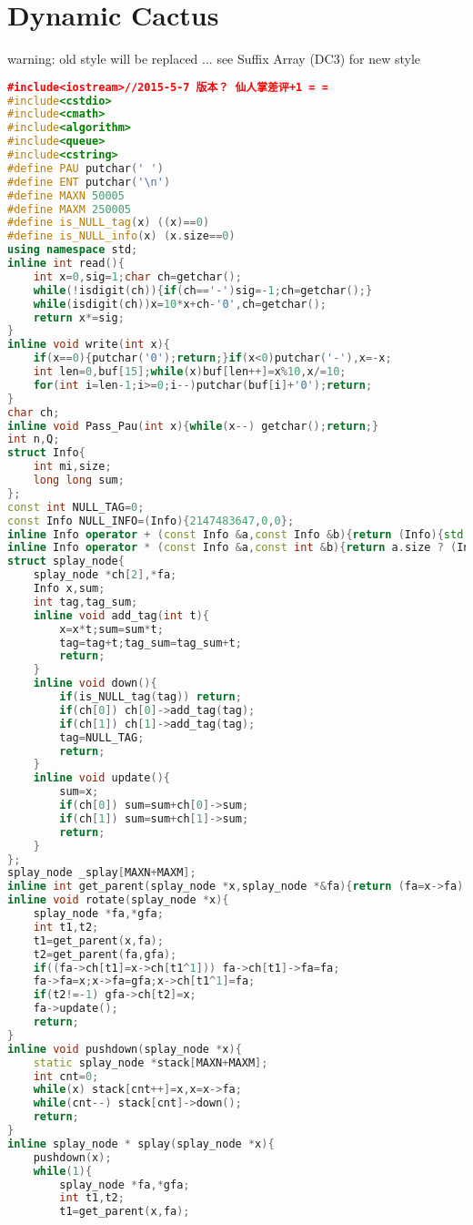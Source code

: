\documentclass{book}
\begin{document}
\section{Dynamic Cactus}
warning: old style will be replaced ... see Suffix Array (DC3) for new style\begin{lstlisting}[language=C++,title={Dynamic Cactus.hpp (14822 bytes, 608 lines)}]
﻿#include<iostream>//2015-5-7 版本？ 仙人掌差评+1 = =
#include<cstdio>
#include<cmath>
#include<algorithm>
#include<queue>
#include<cstring>
#define PAU putchar(' ')
#define ENT putchar('\n')
#define MAXN 50005
#define MAXM 250005
#define is_NULL_tag(x) ((x)==0)
#define is_NULL_info(x) (x.size==0)
using namespace std;
inline int read(){
	int x=0,sig=1;char ch=getchar();
	while(!isdigit(ch)){if(ch=='-')sig=-1;ch=getchar();}
	while(isdigit(ch))x=10*x+ch-'0',ch=getchar();
	return x*=sig;
}
inline void write(int x){
	if(x==0){putchar('0');return;}if(x<0)putchar('-'),x=-x;
	int len=0,buf[15];while(x)buf[len++]=x%10,x/=10;
	for(int i=len-1;i>=0;i--)putchar(buf[i]+'0');return;
}
char ch;
inline void Pass_Pau(int x){while(x--) getchar();return;}
int n,Q;
struct Info{
	int mi,size;
	long long sum;
};
const int NULL_TAG=0;
const Info NULL_INFO=(Info){2147483647,0,0};
inline Info operator + (const Info &a,const Info &b){return (Info){std::min(a.mi,b.mi),a.size+b.size,a.sum+b.sum};}
inline Info operator * (const Info &a,const int &b){return a.size ? (Info){a.mi+b,a.size,a.sum+1LL*a.size*b}: a;}
struct splay_node{
	splay_node *ch[2],*fa;
	Info x,sum;
	int tag,tag_sum;
	inline void add_tag(int t){
		x=x*t;sum=sum*t;
		tag=tag+t;tag_sum=tag_sum+t;
		return;
	}
	inline void down(){
		if(is_NULL_tag(tag)) return;
		if(ch[0]) ch[0]->add_tag(tag);
		if(ch[1]) ch[1]->add_tag(tag);
		tag=NULL_TAG;
		return;
	}
	inline void update(){
		sum=x;
		if(ch[0]) sum=sum+ch[0]->sum;
		if(ch[1]) sum=sum+ch[1]->sum;
		return;
	}
};
splay_node _splay[MAXN+MAXM];
inline int get_parent(splay_node *x,splay_node *&fa){return (fa=x->fa) ? fa->ch[1]==x : -1;}//把父亲扔到fa里同时返回d值 
inline void rotate(splay_node *x){
	splay_node *fa,*gfa;
	int t1,t2;
	t1=get_parent(x,fa);
	t2=get_parent(fa,gfa);
	if((fa->ch[t1]=x->ch[t1^1])) fa->ch[t1]->fa=fa;
	fa->fa=x;x->fa=gfa;x->ch[t1^1]=fa;
	if(t2!=-1) gfa->ch[t2]=x;
	fa->update();
	return;
}
inline void pushdown(splay_node *x){
	static splay_node *stack[MAXN+MAXM];
	int cnt=0;
	while(x) stack[cnt++]=x,x=x->fa;
	while(cnt--) stack[cnt]->down();
	return;
}
inline splay_node * splay(splay_node *x){
	pushdown(x);
	while(1){
		splay_node *fa,*gfa;
		int t1,t2;
		t1=get_parent(x,fa);

\end{lstlisting}
\end{document}
